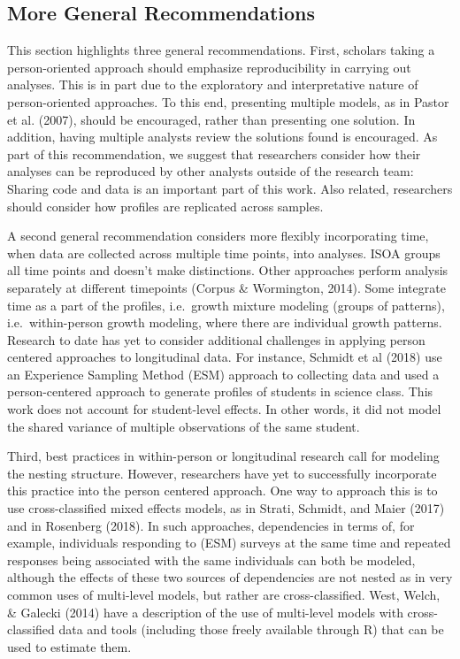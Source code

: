 \documentclass[man]{apa6}
\begin{document}
\hypertarget{more-general-recommendations}{%
\subsection{More General Recommendations}\label{more-general-recommendations}}

This section highlights three general recommendations. First, scholars taking a
person-oriented approach should emphasize reproducibility in carrying out
analyses. This is in part due to the exploratory and interpretative nature of
person-oriented approaches. To this end, presenting multiple models, as in
Pastor et al. (2007), should be encouraged, rather than presenting one solution.
In addition, having multiple analysts review the solutions found is encouraged.
As part of this recommendation, we suggest that researchers consider how their
analyses can be reproduced by other analysts outside of the research team:
Sharing code and data is an important part of this work. Also related,
researchers should consider how profiles are replicated across samples.

A second general recommendation considers more flexibly incorporating time, when
data are collected across multiple time points, into analyses. ISOA groups all
time points and doesn't make distinctions. Other approaches perform analysis
separately at different timepoints (Corpus \& Wormington, 2014). Some integrate
time as a part of the profiles, i.e.~growth mixture modeling (groups of
patterns), i.e.~within-person growth modeling, where there are individual growth
patterns. Research to date has yet to consider additional challenges in applying
person centered approaches to longitudinal data. For instance, Schmidt et al
(2018) use an Experience Sampling Method (ESM) approach to collecting data and
used a person-centered approach to generate profiles of students in science
class. This work does not account for student-level effects. In other words, it
did not model the shared variance of multiple observations of the same student.

Third, best practices in within-person or longitudinal research call for
modeling the nesting structure. However, researchers have yet to successfully
incorporate this practice into the person centered approach. One way to approach
this is to use cross-classified mixed effects models, as in Strati, Schmidt, and
Maier (2017) and in Rosenberg (2018). In such approaches, dependencies in terms
of, for example, individuals responding to (ESM) surveys at the same time and
repeated responses being associated with the same individuals can both be
modeled, although the effects of these two sources of dependencies are not
nested as in very common uses of multi-level models, but rather are
cross-classified. West, Welch, \& Galecki (2014) have a description of the use of
multi-level models with cross-classified data and tools (including those freely
available through R) that can be used to estimate them.
\end{document}
